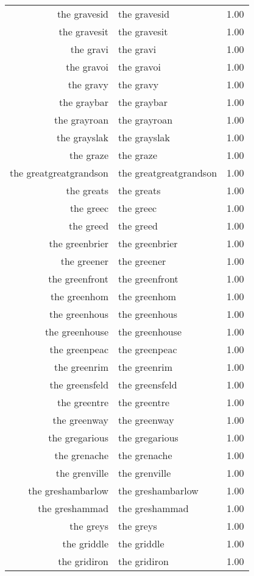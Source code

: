 \begin{table}[ht]
\begin{tabular}{rlr}
  the gravesid & the gravesid & 1.00 \\ 
  the gravesit & the gravesit & 1.00 \\ 
  the gravi & the gravi & 1.00 \\ 
  the gravoi & the gravoi & 1.00 \\ 
  the gravy & the gravy & 1.00 \\ 
  the graybar & the graybar & 1.00 \\ 
  the grayroan & the grayroan & 1.00 \\ 
  the grayslak & the grayslak & 1.00 \\ 
  the graze & the graze & 1.00 \\ 
  the greatgreatgrandson & the greatgreatgrandson & 1.00 \\ 
  the greats & the greats & 1.00 \\ 
  the greec & the greec & 1.00 \\ 
  the greed & the greed & 1.00 \\ 
  the greenbrier & the greenbrier & 1.00 \\ 
  the greener & the greener & 1.00 \\ 
  the greenfront & the greenfront & 1.00 \\ 
  the greenhom & the greenhom & 1.00 \\ 
  the greenhous & the greenhous & 1.00 \\ 
  the greenhouse & the greenhouse & 1.00 \\ 
  the greenpeac & the greenpeac & 1.00 \\ 
  the greenrim & the greenrim & 1.00 \\ 
  the greensfeld & the greensfeld & 1.00 \\ 
  the greentre & the greentre & 1.00 \\ 
  the greenway & the greenway & 1.00 \\ 
  the gregarious & the gregarious & 1.00 \\ 
  the grenache & the grenache & 1.00 \\ 
  the grenville & the grenville & 1.00 \\ 
  the greshambarlow & the greshambarlow & 1.00 \\ 
  the greshammad & the greshammad & 1.00 \\ 
  the greys & the greys & 1.00 \\ 
  the griddle & the griddle & 1.00 \\ 
  the gridiron & the gridiron & 1.00 \\ 

\end{tabular}
\end{table}
